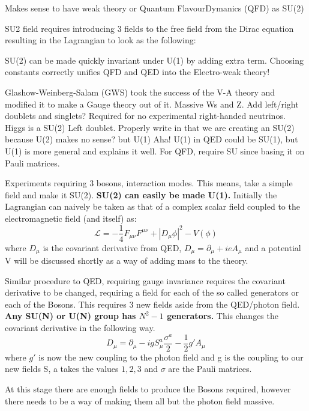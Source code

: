 Makes sense to have weak theory or Quantum FlavourDymanics (QFD) as SU(2)

SU2 field requires introducing 3 fields to the free field from the Dirac equation resulting in the Lagrangian to look as the following:

SU(2) can be made quickly invariant under U(1) by adding extra term. Choosing constants correctly unifies QFD and QED into the Electro-weak theory! 

Glashow-Weinberg-Salam (GWS) took the success of the V-A theory and modified it to make a Gauge theory out of it. Massive Ws and Z. Add left/right doublets and singlets? Required for no experimental right-handed neutrinos. Higgs is a SU(2) Left doublet. Properly write in that we are creating an SU(2) because U(2) makes no sense? but U(1) Aha! U(1) in QED could be SU(1), but U(1) is more general and explains it well. For QFD, require SU since basing it on Pauli matrices.

Experiments requiring 3 bosons, interaction modes. This means, take a simple field and make it SU(2). \textbf{SU(2) can easily be made U(1).} Initially the Lagrangian can naively be taken as that of a complex scalar field coupled to the electromagnetic field (and itself) as:
\begin{equation}
\mathcal{L} = - \frac{1}{4} F_{\mu\nu}F^{\mu\nu} + |D_\mu \phi |^2  -V(\phi)
\end{equation}
where $D_\mu$ is the covariant derivative from QED, $D_\mu = \partial_\mu +ieA_\mu$ and a potential V will be discussed shortly as a way of adding mass to the theory.

Similar procedure to QED, requiring gauge invariance requires the covariant derivative to be changed, requiring a field for each of the so called generators or each of the Bosons. This requires 3 new fields aside from the QED/photon field. \textbf{Any SU(N) or U(N) group has $N^2 -1$ generators.} This changes the covariant derivative in the following way.
\begin{equation}
D_\mu = \partial_\mu - ig S^a_\mu \frac{\sigma^a}{2} - \frac{1}{2}g' A_\mu
\end{equation}
where $g'$ is now the new coupling to the photon field and g is the coupling to our new fields S, a takes the values ${1,2,3}$ and $\sigma$ are the Pauli matrices.

At this stage there are enough fields to produce the Bosons required, however there needs to be a way of making them all but the photon field massive.

